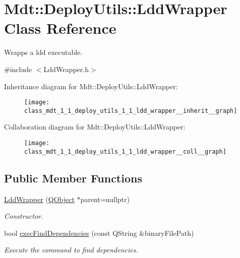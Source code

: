 \hypertarget{class_mdt_1_1_deploy_utils_1_1_ldd_wrapper}{}\section{Mdt\+:\+:Deploy\+Utils\+:\+:Ldd\+Wrapper Class Reference}
\label{class_mdt_1_1_deploy_utils_1_1_ldd_wrapper}


Wrapps a ldd executable.  




{\ttfamily \#include $<$Ldd\+Wrapper.\+h$>$}



Inheritance diagram for Mdt\+:\+:Deploy\+Utils\+:\+:Ldd\+Wrapper\+:
\nopagebreak
\begin{figure}[H]
\begin{center}
\leavevmode
\texttt{[image: class\_mdt\_1\_1\_deploy\_utils\_1\_1\_ldd\_wrapper\_\_inherit\_\_graph]}
\end{center}
\end{figure}


Collaboration diagram for Mdt\+:\+:Deploy\+Utils\+:\+:Ldd\+Wrapper\+:
\nopagebreak
\begin{figure}[H]
\begin{center}
\leavevmode
\texttt{[image: class\_mdt\_1\_1\_deploy\_utils\_1\_1\_ldd\_wrapper\_\_coll\_\_graph]}
\end{center}
\end{figure}
\subsection*{Public Member Functions}
\begin{DoxyCompactItemize}
\item 
\hyperlink{class_mdt_1_1_deploy_utils_1_1_ldd_wrapper_af06a59c19dd4cff1cd7265d884496ef5}{Ldd\+Wrapper} (\hyperlink{class_q_object}{Q\+Object} $\ast$parent=nullptr)
\begin{DoxyCompactList}\small\item\em Constructor. \end{DoxyCompactList}\item 
bool \hyperlink{class_mdt_1_1_deploy_utils_1_1_ldd_wrapper_a156c129e6c120c46139cacde66788d92}{exec\+Find\+Dependencies} (const Q\+String \&binary\+File\+Path)
\begin{DoxyCompactList}\small\item\em Execute the command to find dependencies. \end{DoxyCompactList}\end{DoxyCompactItemize}
